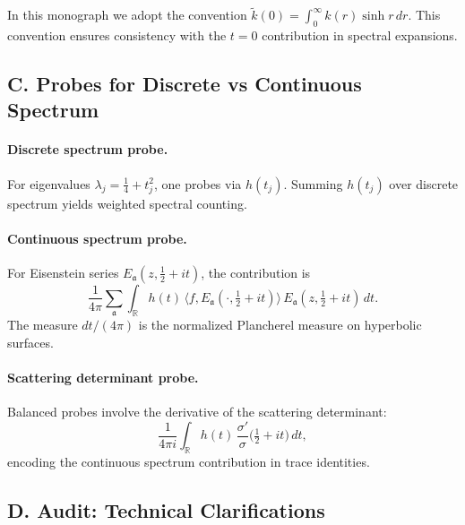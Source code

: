 \begin{remark}
In this monograph we adopt the convention $\tilde k(0)=\int_0^\infty k(r)\sinh r\,dr$. This convention ensures consistency
with the $t=0$ contribution in spectral expansions.
\end{remark}

\subsection*{C. Probes for Discrete vs Continuous Spectrum}
\label{subsec:probes}

\paragraph{Discrete spectrum probe.}
For eigenvalues $\lambda_j=\tfrac14+t_j^2$, one probes via $h(t_j)$.
Summing $h(t_j)$ over discrete spectrum yields weighted spectral counting.

\paragraph{Continuous spectrum probe.}
For Eisenstein series $E_{\mathfrak a}(z,\tfrac12+it)$, the contribution is
\[
   \frac{1}{4\pi}\sum_{\mathfrak a}\int_{\mathbb{R}} h(t)\,
   \langle f, E_{\mathfrak a}(\cdot,\tfrac12+it)\rangle\,
   E_{\mathfrak a}(z,\tfrac12+it)\,dt.
\]
The measure $dt/(4\pi)$ is the normalized Plancherel measure on hyperbolic surfaces.

\paragraph{Scattering determinant probe.}
Balanced probes involve the derivative of the scattering determinant:
\[
   \frac{1}{4\pi i}\int_{\mathbb{R}} h(t)\,\frac{\sigma'}{\sigma}\!\big(\tfrac12+it\big)\,dt,
\]
encoding the continuous spectrum contribution in trace identities.

\subsection*{D. Audit: Technical Clarifications}
\label{subsec:audit-test}

